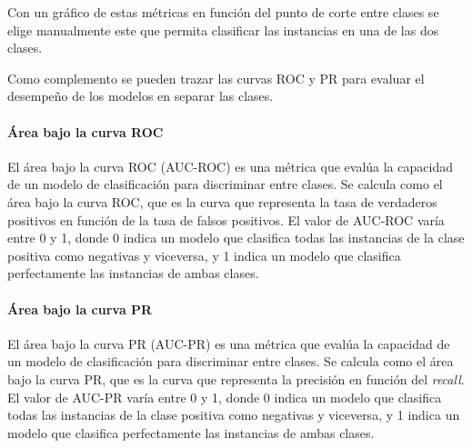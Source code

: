 \documentclass[a4paper]{report}
\begin{document}
Con un gráfico de estas métricas en función del punto de corte entre clases se elige manualmente este que permita clasificar las instancias en una de las dos clases.

Como complemento se pueden trazar las curvas ROC y PR para evaluar el desempeño de los modelos en separar las clases.


\paragraph{Área bajo la curva ROC}
El área bajo la curva ROC (AUC-ROC) es una métrica que evalúa la capacidad de un modelo de clasificación para discriminar entre clases.
Se calcula como el área bajo la curva ROC, que es la curva que representa la tasa de verdaderos positivos en función de la tasa de falsos positivos.
El valor de AUC-ROC varía entre 0 y 1, donde 0 indica un modelo que clasifica todas las instancias de la clase positiva como negativas y viceversa, y 1 indica un modelo que clasifica perfectamente las instancias de ambas clases.


\paragraph{Área bajo la curva PR}
El área bajo la curva PR (AUC-PR) es una métrica que evalúa la capacidad de un modelo de clasificación para discriminar entre clases.
Se calcula como el área bajo la curva PR, que es la curva que representa la precisión en función del \emph{recall}.
El valor de AUC-PR varía entre 0 y 1, donde 0 indica un modelo que clasifica todas las instancias de la clase positiva como negativas y viceversa, y 1 indica un modelo que clasifica perfectamente las instancias de ambas clases.


%

\end{document}
